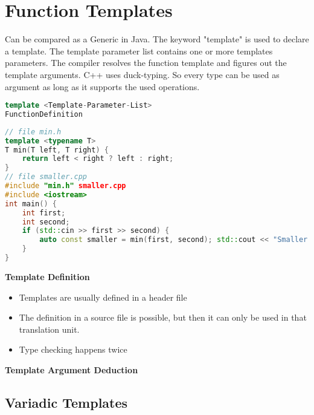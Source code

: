 
\section{Function Templates} 
Can be compared as a Generic in Java. The keyword "template" is used to declare a template. The template parameter list contains one or more templates parameters.
The compiler resolves the function template and figures out the template arguments. C++ uses duck-typing. So every type can be used as argument as long as it supports the used operations.

\begin{lstlisting}[language=C++]
template <Template-Parameter-List>
FunctionDefinition
\end{lstlisting}

\begin{lstlisting}[language=C++]
// file min.h
template <typename T>
T min(T left, T right) {
	return left < right ? left : right;
}
// file smaller.cpp
#include "min.h" smaller.cpp
#include <iostream>
int main() {
	int first;
	int second;
	if (std::cin >> first >> second) {
		auto const smaller = min(first, second); std::cout << "Smaller of " << first << " and " << second << " is: " << smaller << '\n';
	}
}
\end{lstlisting}

\textbf{Template Definition}
\begin{itemize}
  \itemsep -0.5em 
  \item Templates are usually defined in a header file
  \item The definition in a source file is possible, but then it can only be used in that translation unit.
  \item Type checking happens twice
\end{itemize}

\textbf{Template Argument Deduction}

\subsection{Variadic Templates}

\pagebreak